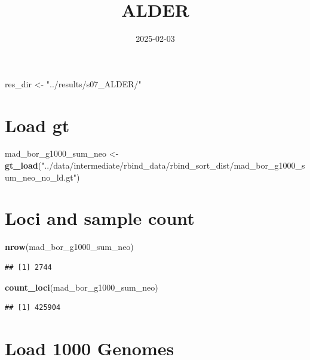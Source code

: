 \documentclass[
]{article}
\title{ALDER}
\author{}
\date{\vspace{-2.5em}2025-02-03}
\newenvironment{Shaded}{\begin{snugshade}}{\end{snugshade}}
\newcommand{\FunctionTok}[1]{\textcolor[rgb]{0.13,0.29,0.53}{\textbf{#1}}}
\newcommand{\NormalTok}[1]{#1}
\newcommand{\OtherTok}[1]{\textcolor[rgb]{0.56,0.35,0.01}{#1}}
\newcommand{\StringTok}[1]{\textcolor[rgb]{0.31,0.60,0.02}{#1}}
\begin{document}
\maketitle

\begin{Shaded}
\begin{Highlighting}[]
\NormalTok{res\_dir }\OtherTok{\textless{}{-}} \StringTok{"../results/s07\_ALDER/"}
\end{Highlighting}
\end{Shaded}

\section{Load gt}\label{load-gt}

\begin{Shaded}
\begin{Highlighting}[]
\NormalTok{mad\_bor\_g1000\_sum\_neo }\OtherTok{\textless{}{-}}
  \FunctionTok{gt\_load}\NormalTok{(}\StringTok{"../data/intermediate/rbind\_data/rbind\_sort\_dist/mad\_bor\_g1000\_sum\_neo\_no\_ld.gt"}\NormalTok{)}
\end{Highlighting}
\end{Shaded}

\section{Loci and sample count}\label{loci-and-sample-count}

\begin{Shaded}
\begin{Highlighting}[]
\FunctionTok{nrow}\NormalTok{(mad\_bor\_g1000\_sum\_neo)}
\end{Highlighting}
\end{Shaded}

\begin{verbatim}
## [1] 2744
\end{verbatim}

\begin{Shaded}
\begin{Highlighting}[]
\FunctionTok{count\_loci}\NormalTok{(mad\_bor\_g1000\_sum\_neo)}
\end{Highlighting}
\end{Shaded}

\begin{verbatim}
## [1] 425904
\end{verbatim}

\section{Load 1000 Genomes}\label{load-1000-genomes}
\end{document}
